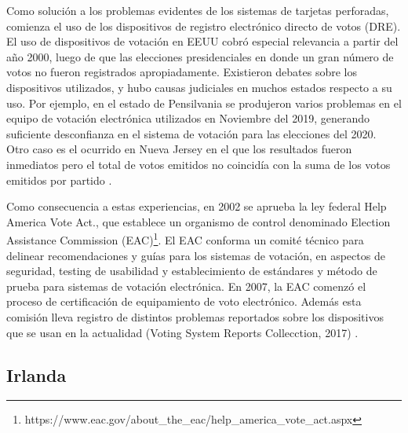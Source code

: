 Como solución a los problemas evidentes de los sistemas de tarjetas perforadas, comienza el uso de los dispositivos de registro electrónico directo de votos (DRE). El uso de dispositivos de votación en EEUU cobró especial relevancia a partir del año 2000, luego de que las elecciones presidenciales en donde un gran número de votos no fueron registrados apropiadamente. Existieron debates sobre los dispositivos utilizados, y hubo causas judiciales en muchos estados respecto a su uso. Por ejemplo, en el estado de Pensilvania se produjeron varios problemas en el equipo de votación electrónica utilizados en Noviembre del 2019, generando suficiente desconfianza en el sistema de votación para las elecciones del 2020. Otro caso es el ocurrido en Nueva Jersey en el que los resultados fueron inmediatos pero el total de votos emitidos no coincidía con la suma de los votos emitidos por partido \cite{eleccionesEEUU}.

Como consecuencia a estas experiencias, en 2002 se aprueba la ley federal Help America Vote Act., que establece un organismo de control denominado Election Assistance Commission (EAC)\footnote{https://www.eac.gov/about\_the\_eac/help\_america\_vote\_act.aspx}. El EAC conforma un comité técnico para delinear recomendaciones y guías para los sistemas de votación, en aspectos de seguridad, testing de usabilidad y establecimiento de estándares y método de prueba para sistemas de votación electrónica. En 2007, la EAC comenzó el proceso de certificación de equipamiento de voto electrónico. Además esta comisión lleva registro de distintos problemas reportados sobre los dispositivos que se usan en la actualidad (Voting System Reports Collecction, 2017) \cite{problemasReportados}.

\subsection{Irlanda}

